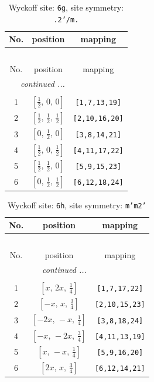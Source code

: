 \documentclass[fleqn,8pt]{jsarticle}
\begin{document}
\renewcommand{\arraystretch}{1.2}
\begin{longtable}{ccc}
\caption{Wyckoff site: {\tt 6g}, site symmetry: {\tt .2'/m.}}
 \\
 \hline \hline
No. & position & mapping \\ \hline \endfirsthead

\multicolumn{2}{l}{\tablename\ \thetable{}} \\
 \hline \hline
No. & position & mapping \\ \hline \endhead

 \hline \hline
\multicolumn{2}{r}{\footnotesize\it continued ...} \\ \endfoot

 \hline \hline
\multicolumn{2}{r}{} \\ \endlastfoot

1 & $\left[ \frac{1}{2},\, 0,\, 0 \right]$ & {\tt [1,7,13,19]} \\ \hline
2 & $\left[ \frac{1}{2},\, \frac{1}{2},\, \frac{1}{2} \right]$ & {\tt [2,10,16,20]} \\ \hline
3 & $\left[ 0,\, \frac{1}{2},\, 0 \right]$ & {\tt [3,8,14,21]} \\ \hline
4 & $\left[ \frac{1}{2},\, 0,\, \frac{1}{2} \right]$ & {\tt [4,11,17,22]} \\ \hline
5 & $\left[ \frac{1}{2},\, \frac{1}{2},\, 0 \right]$ & {\tt [5,9,15,23]} \\ \hline
6 & $\left[ 0,\, \frac{1}{2},\, \frac{1}{2} \right]$ & {\tt [6,12,18,24]} \\
\end{longtable}
\renewcommand{\arraystretch}{1.2}
\begin{longtable}{ccc}
\caption{Wyckoff site: {\tt 6h}, site symmetry: {\tt m'm2'}}
 \\
 \hline \hline
No. & position & mapping \\ \hline \endfirsthead

\multicolumn{2}{l}{\tablename\ \thetable{}} \\
 \hline \hline
No. & position & mapping \\ \hline \endhead

 \hline \hline
\multicolumn{2}{r}{\footnotesize\it continued ...} \\ \endfoot

 \hline \hline
\multicolumn{2}{r}{} \\ \endlastfoot

1 & $\left[ x,\, 2 x,\, \frac{1}{4} \right]$ & {\tt [1,7,17,22]} \\ \hline
2 & $\left[ - x,\, x,\, \frac{3}{4} \right]$ & {\tt [2,10,15,23]} \\ \hline
3 & $\left[ - 2 x,\, - x,\, \frac{1}{4} \right]$ & {\tt [3,8,18,24]} \\ \hline
4 & $\left[ - x,\, - 2 x,\, \frac{3}{4} \right]$ & {\tt [4,11,13,19]} \\ \hline
5 & $\left[ x,\, - x,\, \frac{1}{4} \right]$ & {\tt [5,9,16,20]} \\ \hline
6 & $\left[ 2 x,\, x,\, \frac{3}{4} \right]$ & {\tt [6,12,14,21]} \\
\end{longtable}
\end{document}
